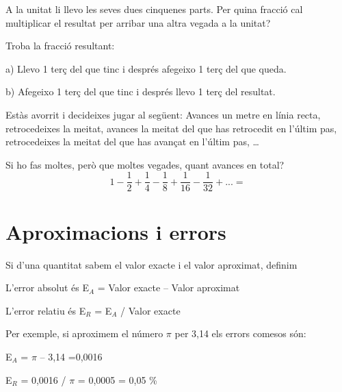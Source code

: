 \begin{mylist}
	\exer  A la unitat li llevo les seves dues cinquenes parts. Per quina fracció cal multiplicar el resultat per arribar una altra vegada a la unitat?




	\exer  Troba la fracció resultant:


a) Llevo 1 terç del que tinc i després afegeixo 1 terç del que queda.

b) Afegeixo 1 terç del que tinc i després llevo 1 terç del resultat.





	\exer  Estàs avorrit i decideixes jugar al següent: Avances un metre en línia recta, retrocedeixes la meitat, avances la meitat del que has retrocedit en l'últim pas, retrocedeixes la meitat del que has avançat en l'últim pas, {\dots}


Si ho fas moltes, però que moltes vegades, quant avances en total?
\[1-\frac{1}{2} +\frac{1}{4} -\frac{1}{8} +\frac{1}{16} -\frac{1}{32} +...=\] 

\end{mylist}


\pagebreak

\section{Aproximacions i errors}
 
\begin{theorybox}
Si d'una quantitat sabem el valor exacte i el valor aproximat, definim

L'error absolut és E${}_{A}$ = {\textbar}Valor exacte -- Valor aproximat{\textbar}

L'error relatiu és E${}_{R}$ = E${}_{A}$ / Valor exacte

Per exemple, si aproximem el número $\pi$ per 3,14 els errors comesos són:

E${}_{A}$ = {\textbar}$\pi$ -- 3,14{\textbar} =0,0016

E${}_{R}$ = 0,0016 / $\pi$ = 0,0005    =    0,05 \%

\end{theorybox}

